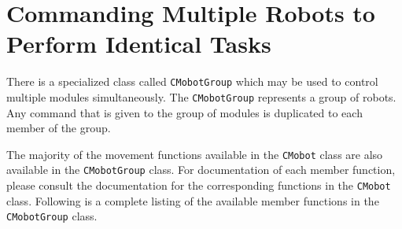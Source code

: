 \documentclass{article}
\begin{document}
\section{Commanding Multiple Robots to Perform Identical Tasks}
There is a specialized class called \texttt{CMobotGroup} which may be used
to control multiple modules simultaneously. The \texttt{CMobotGroup} represents
a group of robots. Any command that is given to the group of modules is 
duplicated to each member of the group.

The majority of the movement functions available in the \texttt{CMobot} class
are also available in the \texttt{CMobotGroup} class. 
For documentation of each member function, please consult the documentation
for the corresponding functions in the \texttt{CMobot} class. Following
is a complete listing of the available member functions in the \texttt{CMobotGroup}
class.
\end{document}
